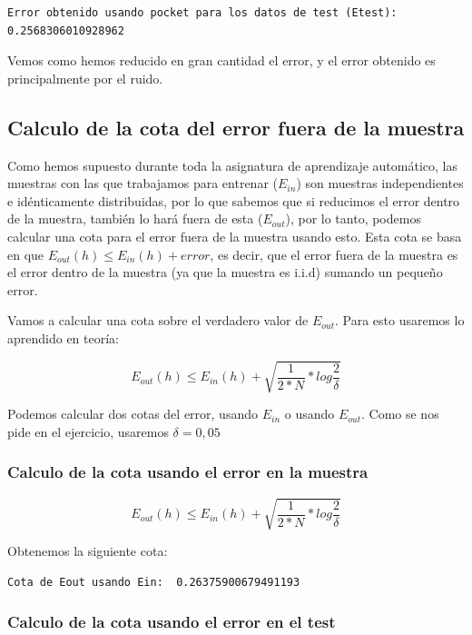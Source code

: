 \documentclass[12pt, spanish]{article}
\begin{document}
\begin{lstlisting}
Error obtenido usando pocket para los datos de test (Etest):  0.2568306010928962
\end{lstlisting}


Vemos como hemos reducido en gran cantidad el error, y el error obtenido es principalmente por el ruido.


\subsection{Calculo de la cota del error fuera de la muestra}

Como hemos supuesto durante toda la asignatura de aprendizaje automático, las muestras con las que trabajamos para entrenar ($E_{in}$) son muestras independientes e idénticamente distribuidas, por lo que sabemos que si reducimos el error dentro de la muestra, también lo hará fuera de esta ($E_{out}$), por lo tanto, podemos calcular una cota para el error fuera de la muestra usando esto. Esta cota se basa en que $E_{out}(h) \leq E_{in}(h) + error$, es decir, que el error fuera de la muestra es el error dentro de la muestra (ya que la muestra es i.i.d) sumando un pequeño error.

Vamos a calcular una cota sobre el verdadero valor de $E_{out}$. Para esto usaremos lo aprendido en teoría:

$$ E_{out}(h) \leq E_{in}(h) + \sqrt{\frac{1}{2*N}*log\frac{2}{\delta}} $$

Podemos calcular dos cotas del error, usando $E_{in}$ o usando $E_{out}$. Como se nos pide en el ejercicio, usaremos $\delta = 0,05$

\subsubsection{Calculo de la cota usando el error en la muestra}

$$ E_{out}(h) \leq E_{in}(h) + \sqrt{\frac{1}{2*N}*log\frac{2}{\delta}} $$

Obtenemos la siguiente cota:

\begin{lstlisting}
Cota de Eout usando Ein:  0.26375900679491193
\end{lstlisting}



\subsubsection{Calculo de la cota usando el error en el test}
\end{document}
